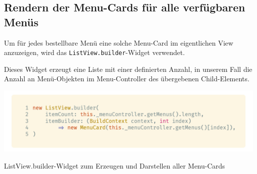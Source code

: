 \subsection{Rendern der Menu-Cards für alle verfügbaren Menüs}

Um für jedes bestellbare Menü eine solche Menu-Card im eigentlichen View anzuzeigen,
wird das \lstinline{ListView.builder}-Widget verwendet.

Dieses Widget erzeugt eine Liste mit einer definierten Anzahl, in unserem Fall
die Anzahl an Menü-Objekten im Menu-Controller des übergebenen Child-Elements.

\begin{code}[H]
    \centering
    \includegraphics[width=1\textwidth]{images/Client/views/menuview/menuListViewBuilder.png}
    \vspace{-25pt}
    \caption{ListView.builder-Widget zum Erzeugen und Darstellen aller Menu-Cards}
\end{code}

\newpage